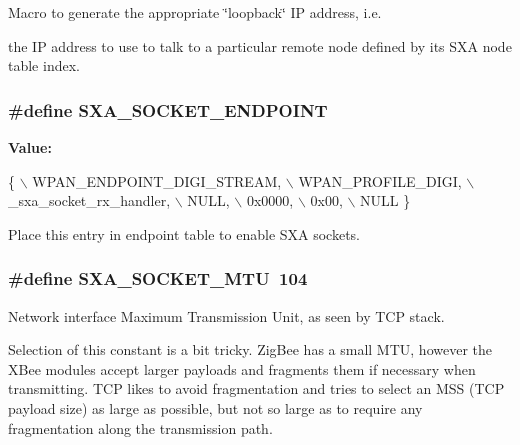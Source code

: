 Macro to generate the appropriate \char`\"{}loopback\char`\"{} I\-P address, i.\-e. 

the I\-P address to use to talk to a particular remote node defined by its S\-X\-A node table index. \hypertarget{group___s_x_a_gacef6e474f41d87ead3269f543f2c5efd}{
\subsubsection[{S\-X\-A\-\_\-\-S\-O\-C\-K\-E\-T\-\_\-\-E\-N\-D\-P\-O\-I\-N\-T}]{\setlength{\rightskip}{0pt plus 5cm}\#define S\-X\-A\-\_\-\-S\-O\-C\-K\-E\-T\-\_\-\-E\-N\-D\-P\-O\-I\-N\-T}}\label{group___s_x_a_gacef6e474f41d87ead3269f543f2c5efd}
{\bfseries Value\-:}
\begin{DoxyCode}
\{ \(\backslash\)
        WPAN\_ENDPOINT\_DIGI\_STREAM,  \(\backslash\)
        WPAN\_PROFILE\_DIGI,          \(\backslash\)
        \_sxa\_socket\_rx\_handler,     \(\backslash\)
        NULL,                       \(\backslash\)
        0x0000,                     \(\backslash\)
        0x00,                       \(\backslash\)
        NULL \}
\end{DoxyCode}


Place this entry in endpoint table to enable S\-X\-A sockets. 

\hypertarget{group___s_x_a_ga24cd1c18c4568b532a09c4d3ae6a3700}{
\subsubsection[{S\-X\-A\-\_\-\-S\-O\-C\-K\-E\-T\-\_\-\-M\-T\-U}]{\setlength{\rightskip}{0pt plus 5cm}\#define S\-X\-A\-\_\-\-S\-O\-C\-K\-E\-T\-\_\-\-M\-T\-U~104}}\label{group___s_x_a_ga24cd1c18c4568b532a09c4d3ae6a3700}


Network interface Maximum Transmission Unit, as seen by T\-C\-P stack. 

Selection of this constant is a bit tricky. Zig\-Bee has a small M\-T\-U, however the X\-Bee modules accept larger payloads and fragments them if necessary when transmitting. T\-C\-P likes to avoid fragmentation and tries to select an M\-S\-S (T\-C\-P payload size) as large as possible, but not so large as to require any fragmentation along the transmission path.

